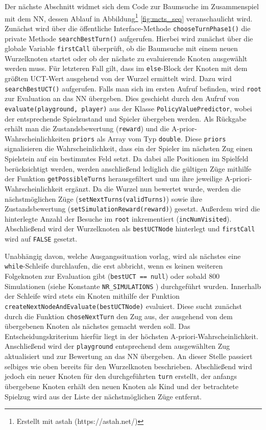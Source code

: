 \documentclass[12pt,a4paper]{article}
\begin{document}
Der nächste Abschnitt widmet sich dem Code zur Baumsuche im Zusammenspiel mit dem NN, dessen Ablauf in Abbildung\footnote{Erstellt mit astah (https://astah.net/)} \ref{fig:mcts_seq} veranschaulicht wird. Zunächst wird über die öffentliche Interface-Methode \texttt{chooseTurnPhase1()} die private Methode \texttt{searchBestTurn()} aufgerufen. Hierbei wird zunächst über die globale Variable \texttt{firstCall} überprüft, ob die Baumsuche mit einem neuen Wurzelknoten startet oder ob der nächste zu evaluierende Knoten ausgewählt werden muss. Für letzteren Fall gilt, dass im \texttt{else}-Block der Knoten mit dem größten UCT-Wert ausgehend von der Wurzel ermittelt wird. Dazu wird \texttt{searchBestUCT()} aufgerufen. Falls man sich im ersten Aufruf befinden, wird \texttt{root} zur Evaluation an das NN übergeben. Dies geschieht durch den Aufruf von \texttt{evaluate(playground, player)} aus der Klasse \texttt{PolicyValuePredictor}, wobei der entsprechende Spielzustand und Spieler übergeben werden. Als Rückgabe erhält man die Zustandsbewertung (\texttt{reward}) und die A-prior-Wahrscheinlichkeiten \texttt{priors} als Array vom Typ \texttt{double}. Diese \texttt{priors} signalisieren die Wahrscheinlichkeit, dass ein der Spieler im nächsten Zug einen Spielstein auf ein bestimmtes Feld setzt. Da dabei alle Positionen im Spielfeld berücksichtigt werden, werden anschließend lediglich die gültigen Züge mithilfe der Funktion \texttt{getPossibleTurns} herausgefiltert und um ihre jeweilige A-priori-Wahrscheinlichkeit ergänzt. Da die Wurzel nun bewertet wurde, werden die nächstmöglichen Züge (\texttt{setNextTurns(validTurns)}) sowie ihre Zustandsbewertung (\texttt{setSimulationReward(reward)}) gesetzt. Außerdem wird die hinterlegte Anzahl der Besuche im \texttt{root} inkrementiert (\texttt{incNumVisited}). Abschließend wird der Wurzelknoten als \texttt{bestUCTNode} hinterlegt und \texttt{firstCall} wird auf \texttt{FALSE} gesetzt. 

Unabhängig davon, welche Ausgangssituation vorlag, wird als nächstes eine \texttt{while}-Schleife durchlaufen, die erst abbricht, wenn es keinen weiteren Folgeknoten zur Evaluation gibt (\texttt{bestUCT == null}) oder sobald 800 Simulationen (siehe Konstante \texttt{NR\_SIMULATIONS} ) durchgeführt wurden. Innerhalb der Schleife wird stets ein Knoten mithilfe der Funktion \texttt{createNextNodeAndEvaluate(bestUCTNode)} evaluiert. Diese sucht zunächst durch die Funktion \texttt{choseNextTurn} den Zug aus, der ausgehend von dem übergebenen Knoten als nächstes gemacht werden soll. Das Entscheidungskriterium hierfür liegt in der höchsten A-priori-Wahrscheinlichkeit. Anschließend wird der \texttt{playground} entsprechend dem ausgewählten Zug aktualisiert und zur Bewertung an das NN übergeben. An dieser Stelle passiert selbiges wie oben bereits für den Wurzelknoten beschrieben. Abschließend wird jedoch ein neuer Knoten für den durchgeführten \texttt{turn} erstellt, der anfangs übergebene Knoten erhält den neuen Knoten als Kind und der betrachtete Spielzug wird aus der Liste der nächstmöglichen Züge entfernt.
\end{document}
